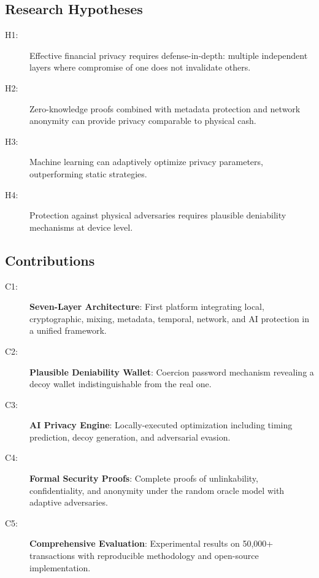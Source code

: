 \documentclass[11pt]{article}
\theoremstyle{definition}
\theoremstyle{plain}
\theoremstyle{remark}
\begin{document}
\subsection{Research Hypotheses}

\begin{description}
    \item[H1:] Effective financial privacy requires defense-in-depth: multiple independent layers where compromise of one does not invalidate others.
    \item[H2:] Zero-knowledge proofs combined with metadata protection and network anonymity can provide privacy comparable to physical cash.
    \item[H3:] Machine learning can adaptively optimize privacy parameters, outperforming static strategies.
    \item[H4:] Protection against physical adversaries requires plausible deniability mechanisms at device level.
\end{description}

\subsection{Contributions}

\begin{description}
    \item[C1:] \textbf{Seven-Layer Architecture}: First platform integrating local, cryptographic, mixing, metadata, temporal, network, and AI protection in a unified framework.
    
    \item[C2:] \textbf{Plausible Deniability Wallet}: Coercion password mechanism revealing a decoy wallet indistinguishable from the real one.
    
    \item[C3:] \textbf{AI Privacy Engine}: Locally-executed optimization including timing prediction, decoy generation, and adversarial evasion.
    
    \item[C4:] \textbf{Formal Security Proofs}: Complete proofs of unlinkability, confidentiality, and anonymity under the random oracle model with adaptive adversaries.
    
    \item[C5:] \textbf{Comprehensive Evaluation}: Experimental results on 50,000+ transactions with reproducible methodology and open-source implementation.
\end{description}
\end{document}
